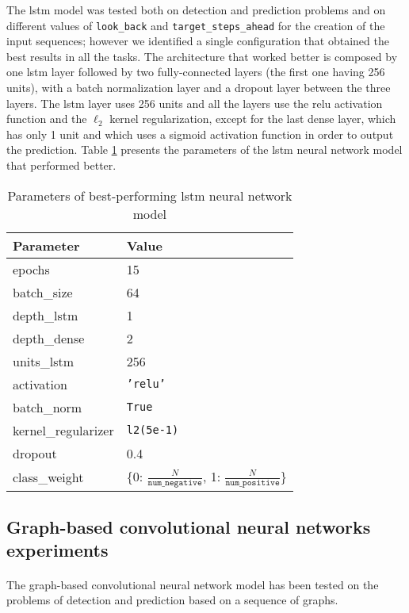 The \acs{lstm} model was tested both on detection and prediction problems and on different values of \texttt{look\_back} and \texttt{target\_steps\_ahead} for the creation of the input sequences; however we identified a single configuration that obtained the best results in all the tasks. The architecture that worked better is composed by one \acs{lstm} layer followed by two fully-connected layers (the first one having 256 units), with a batch normalization layer and a dropout layer between the three layers. The \acs{lstm} layer uses 256 units and all the layers use the \acs{relu} activation function and the $\ell_2$ kernel regularization, except for the last dense layer, which has only 1 unit and which uses a sigmoid activation function in order to output the prediction. Table \ref{tab:lstm_param} presents the parameters of the \acs{lstm} neural network model that performed better.
\begin{table}[htbp]
    \centering
    \begin{tabular}{ll}
        \hline
        \textbf{Parameter}  & \textbf{Value} \\\hline
        epochs              & 15 \\
        batch\_size         & 64 \\
        depth\_lstm         & 1 \\
        depth\_dense        & 2 \\
        units\_lstm         & 256 \\
        activation          & \texttt{'relu'} \\
        batch\_norm         & \texttt{True} \\
        kernel\_regularizer & \texttt{l2(5e-1)} \\
        dropout             & 0.4 \\
        class\_weight       & \{0: $\frac{N}{\texttt{num\_negative}}$, 1: $\frac{N}{\texttt{num\_positive}}$\} \\\hline
    \end{tabular}
    \caption{Parameters of best-performing \acs{lstm} neural network model}
    \label{tab:lstm_param}
\end{table}

\subsection{Graph-based convolutional neural networks experiments}
\paragraph{} The graph-based convolutional neural network model has been tested on the problems of detection and prediction based on a sequence of graphs.

